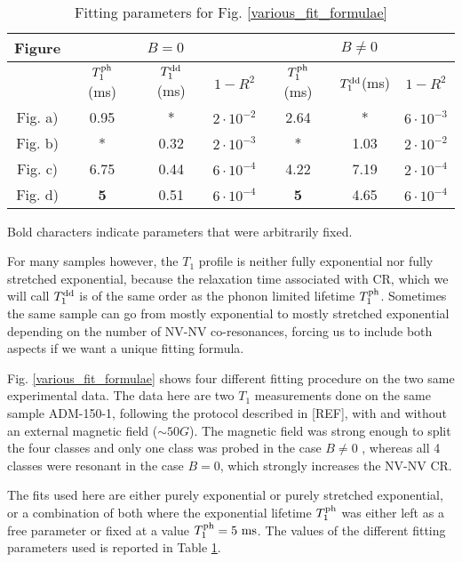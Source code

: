 \documentclass[a4paper,11pt]{report}
\begin{document}
\begin{table}[htbp]
\centering
\caption{Fitting parameters for Fig.
 \ref{various_fit_formulae}}
 \label{fitting table}
\begin{tabular}{c|ccc|ccc}
\toprule
Figure &  \multicolumn{3}{c}{$B=0$} & \multicolumn{3}{c}{$B\neq0$}\\
\midrule
{} &  $T_1^{\rm ph}$ (ms)& $T_1^{\rm dd}$ (ms) & $1-R^2$ &  $T_1^{\rm ph}$ (ms)& $T_1^{\rm dd}$(ms)& $1-R^2$\\
\midrule
Fig. a) & 0.95 & * & $2\cdot 10^{-2}$ & 2.64 & * & $6\cdot 10^{-3}$ \\
Fig. b) & * & 0.32 & $2\cdot 10^{-3}$& * & 1.03 & $2\cdot 10^{-2}$ \\
Fig. c) & 6.75 & 0.44 & $6\cdot 10^{-4}$ & 4.22 & 7.19 & $2\cdot 10^{-4}$\\
Fig. d) & \textbf{5} & 0.51 & $6\cdot 10^{-4}$ & \textbf{5} & 4.65 & $6\cdot 10^{-4}$\\
\bottomrule
\end{tabular}

Bold characters indicate parameters that were arbitrarily fixed.
\end{table}

For many samples however, the $T_1$ profile is neither fully exponential nor fully stretched exponential, because the relaxation time associated with CR, which we will call $T_1^{\rm dd}$ is of the same order as the phonon limited lifetime $T_1^{\rm ph}$. Sometimes the same sample can go from mostly exponential to mostly stretched exponential depending on the number of NV-NV co-resonances, forcing us to include both aspects if we want a unique fitting formula.

Fig. \ref{various_fit_formulae} shows four different fitting procedure on the two same experimental data. The data here are two $T_1$ measurements done on the same sample ADM-150-1, following the protocol described in [REF], with and without an external magnetic field ($\sim 50 G$). The magnetic field was strong enough to split the four classes and only one class was probed in the case $B\neq0$ , whereas all 4 classes were resonant in the case $B=0$, which strongly increases the NV-NV CR. 

The fits used here are either purely exponential or purely stretched exponential, or a combination of both where the exponential lifetime $T_1^{\rm ph}$ was either left as a free parameter or fixed at a value $T_1^{\rm ph}=5\ \rm ms$. The values of the different fitting parameters used is reported in Table \ref{fitting table}.
\end{document}
